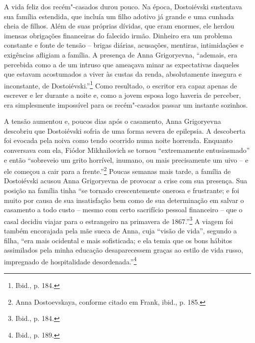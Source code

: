 A vida feliz dos recém"-casados durou pouco. Na época, Dostoiévski
sustentava sua família estendida, que incluía um filho adotivo já grande
e uma cunhada cheia de filhos. Além de suas próprias dívidas, que eram
enormes, ele herdou imensas obrigações financeiras do falecido irmão.
Dinheiro era um problema constante e fonte de tensão -- brigas diárias,
acusações, mentiras, intimidações e exigências afligiam a família. A
presença de Anna Grigoryevna, ``ademais, era percebida como a de um
intruso que ameaçava minar as expectativas daqueles que estavam
acostumados a viver às custas da renda, absolutamente insegura e
inconstante, de Dostoiévski.''\footnote{Ibid., p. 184.} Como resultado,
o escritor era capaz apenas de escrever e ler durante a noite e, como a
jovem esposa logo haveria de perceber, era simplesmente impossível para
os recém"-casados passar um instante sozinhos.

A tensão aumentou e, poucos dias após o casamento, Anna Grigoryevna
descobriu que Dostoiévski sofria de uma forma severa de epilepsia. A
descoberta foi evocada pela noiva como tendo ocorrido numa noite
horrenda. Enquanto conversava com ela, Fiódor Mikhailovich se tornou
``extremamente entusiasmado'' e então ``sobreveio um grito horrível,
inumano, ou mais precisamente um uivo -- e ele começou a cair para a
frente.''\footnote{Anna Dostoevskaya, conforme citado em Frank, ibid., p. 185.} Poucas semanas mais tarde, a família de Dostoiévski acusou Anna Grigoryevna de provocar a crise com sua presença. Sua posição na
família tinha ``se tornado crescentemente onerosa e frustrante; e foi
muito por causa de sua insatisfação bem como de sua determinação em
salvar o casamento a todo custo -- mesmo com certo sacrifício pessoal
financeiro -- que o casal decidiu viajar para o estrangeiro na primavera
de 1867.''\footnote{Ibid., p. 184.} A viagem foi também encorajada pela
mãe sueca de Anna, cuja ``visão de vida'', segundo a filha, ``era mais
ocidental e mais sofisticada; e ela temia que os bons hábitos
assimilados pela minha educação desaparecessem graças ao estilo de vida
russo, impregnado de hospitalidade desordenada.''\footnote{Ibid., p. 189.}


